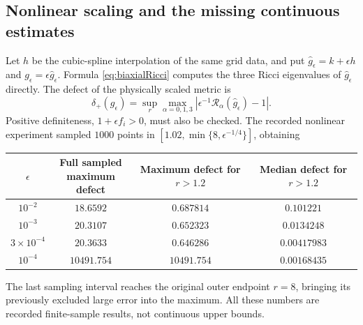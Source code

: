 \documentclass[a4paper,11pt]{article}
\numberwithin{equation}{section}
\theoremstyle{definition}
\begin{document}
\subsection{Nonlinear scaling and the missing continuous estimates}
Let $h$ be the cubic-spline interpolation of the same grid data, and put
$\widehat g_\epsilon=k+\epsilon h$ and $g_\epsilon=\epsilon\widehat g_\epsilon$.
Formula \eqref{eq:biaxialRicci} computes the three Ricci eigenvalues of $\widehat g_\epsilon$ directly.
The defect of the physically scaled metric is
\begin{equation}\label{eq:eh-ls-physical}
\delta_+(g_\epsilon)
=\sup_r\max_{\alpha=0,1,3}
\left|\epsilon^{-1}\mathscr R_\alpha(\widehat g_\epsilon)-1\right|.
\end{equation}
Positive definiteness, $1+\epsilon f_i>0$, must also be checked.
The recorded nonlinear experiment sampled
$1000$ points in $[1.02,\min\{8,\epsilon^{-1/4}\}]$, obtaining
\begin{center}
\small
\begin{tabular}{c c c c}
\toprule
$\epsilon$ & \shortstack{Full sampled\\maximum defect} & \shortstack{Maximum defect\\for $r>1.2$} & \shortstack{Median defect\\for $r>1.2$}\\\midrule
$10^{-2}$ & $18.6592$ & $0.687814$ & $0.101221$\\
$10^{-3}$ & $20.3107$ & $0.652323$ & $0.0134248$\\
$3\times10^{-4}$ & $20.3633$ & $0.646286$ & $0.00417983$\\
$10^{-4}$ & $10491.754$ & $10491.754$ & $0.00168435$\\\bottomrule
\end{tabular}
\end{center}
The last sampling interval reaches the original outer endpoint $r=8$, bringing its previously excluded large error into the maximum.
All these numbers are recorded finite-sample results, not continuous upper bounds.
\end{document}
